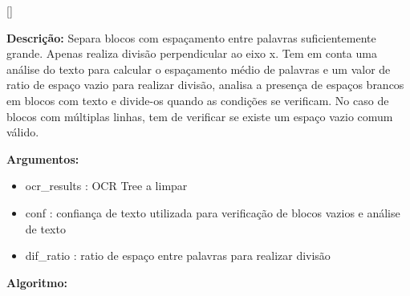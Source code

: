 


[\normalsize]

\textbf{Descrição:} Separa blocos com espaçamento entre palavras suficientemente grande. Apenas realiza divisão perpendicular ao eixo x. Tem em conta uma análise do texto para calcular o espaçamento médio de palavras e um valor de ratio de espaço vazio para realizar divisão, analisa a presença de espaços brancos em blocos com texto e divide-os quando as condições se verificam. No caso de blocos com múltiplas linhas, tem de verificar se existe um espaço vazio comum válido.

\textbf{Argumentos:}
\begin{itemize}\setlength\itemsep{-0.3em}
	\item ocr\_results : OCR Tree a limpar
	\item conf : confiança de texto utilizada para verificação de blocos vazios e análise de texto
	\item dif\_ratio : ratio de espaço entre palavras para realizar divisão
\end{itemize}

\textbf{Algoritmo:}

